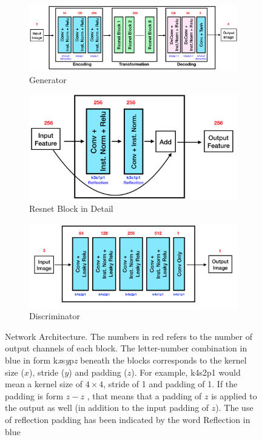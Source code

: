 \documentclass[10pt,twocolumn,letterpaper]{article}
\begin{document}
\begin{figure}[!htb]
     \centering
     \begin{subfigure}[b]{\textwidth}
         \centering
         \includegraphics[width=\textwidth]{generator}
         \caption{Generator}
         \label{fig:gen}
     \end{subfigure}
     \vfill
     \begin{subfigure}[b]{0.6\textwidth}
         \centering
         \includegraphics[width=\textwidth]{res_block}
         \caption{Resnet Block in Detail}
         \label{fig:res}
     \end{subfigure}
     \vfill
     \begin{subfigure}[b]{0.8\textwidth}
         \centering
         \includegraphics[width=\textwidth]{discriminator}
         \caption{Discriminator}
         \label{fig:disc}
     \end{subfigure}
        \caption{Network Architecture. The numbers in red refers to the number of output channels of each block. The letter-number combination in blue in form k\textit{x}s\textit{y}p\textit{z} beneath the blocks corresponds to the kernel size ($x$), stride ($y$) and padding ($z$). For example, k4s2p1 would mean a kernel size of $4 \times 4$, stride of 1 and padding of 1. If the padding is form $z-z$ , that means that a padding of $z$ is applied to the output as well (in addition to the input padding of $z$). The use of reflection padding has been indicated by the word Reflection in blue}
        \label{fig:architecture}
\end{figure} 
\end{document}
